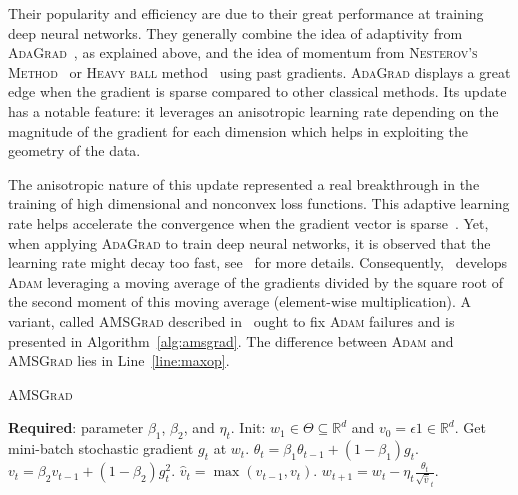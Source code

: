 \documentclass{article}
\begin{document}
Their popularity and efficiency are due to their great performance at training deep neural networks.
They generally combine the idea of adaptivity from \textsc{AdaGrad}~\citep{DHS11,MS10}, as explained above, and the idea of momentum from \textsc{Nesterov's Method}~\citep{N04} or \textsc{Heavy ball} method~\citep{P64} using past gradients.
\textsc{AdaGrad} displays a great edge when the gradient is sparse compared to other classical methods.
Its update has a notable feature: it leverages an anisotropic learning rate depending on the magnitude of the gradient for each dimension which helps in exploiting the geometry of the data. 

The anisotropic nature of this update represented a real breakthrough in the training of high dimensional and nonconvex loss functions.
This adaptive learning rate helps accelerate the convergence when the gradient vector is sparse~\citep{DHS11}. Yet, when applying \textsc{AdaGrad} to train deep neural networks, it is observed that the learning rate might decay too fast, see~\citet{KB15} for more details.
Consequently,~\cite{KB15} develops \textsc{Adam} leveraging a moving average of the gradients divided by the square root of the second moment of this moving average (element-wise multiplication).
A variant, called \textsc{AMSGrad} described in~\citet{RKK18} ought to fix \textsc{Adam} failures and is presented in Algorithm~\ref{alg:amsgrad}. The difference between \textsc{Adam} and \textsc{AMSGrad} lies in Line~\ref{line:maxop}.

\begin{algorithm}[H]
\caption{\textsc{AMSGrad}~\citep{RKK18}} \label{alg:amsgrad}
\begin{algorithmic}[1]
\small
\STATE \textbf{Required}: parameter $\beta_1$, $\beta_2$, and $\eta_t$. 
\STATE Init: $w_{1} \in \Theta \subseteq \mathbb R^d $ and $v_{0} = \epsilon 1 \in \mathbb R^{d}$.
\STATE Get mini-batch stochastic gradient $g_t$ at $w_t$.
\STATE $\theta_t = \beta_1 \theta_{t-1} + (1 - \beta_1) g_t$.
\STATE $v_t = \beta_2 v_{t-1} + (1 - \beta_2) g_t^2$. 
\STATE \label{line:maxop}$\hat{v}_t = \max( \hat{v}_{t-1} , v_t )$. 
\STATE $w_{t+1} = w_t - \eta_t \frac{\theta_t}{ \sqrt{\hat{v}}_t }$.
\ENDFOR
\end{algorithmic}
\end{algorithm}\vspace{-0.1in}
\end{document}
